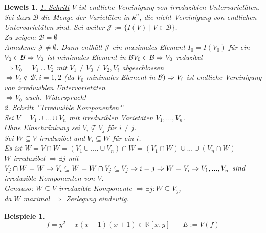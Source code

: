 \documentclass[a4paper,12pt]{report}
\theoremstyle{break}
\newtheorem{Bsp}[Def]{Beispiele}
\theoremstyle{nonumberbreak}
\newtheorem{Bew}{Beweis}
\theoremstyle{nonumberplain}
\begin{document}
\begin{Bew}
\underline{1. Schritt} $V$ ist endliche Vereinigung von irreduziblen Untervarietäten.\\
Sei dazu $\mathcal{B}$ die Menge der Varietäten in $k^n$, die nicht Vereinigung von endlichen Untervarietäten sind. Sei weiter $\mathcal{J}:=\{ I(V)\mid V\in \mathcal{B}\}$.\\
Zu zeigen: $\mathcal{B}=\emptyset$\\
Annahme: $\mathcal{J}\neq \emptyset$. Dann enthält $\mathcal{J}$ ein maximales Element $I_0=I(V_0)$ für ein $V_0\in \mathcal{B}\\
\Rightarrow V_0$ ist minimales Element in $\mathcal{B}\\
V_0 \in \mathcal{B} \Rightarrow V_0$ reduzibel\\
$\Rightarrow V_0 = V_1 \cup V_2$ mit $V_1\neq V_0\neq V_2, V_i$ abgeschlossen\\
$\Rightarrow V_i \notin\mathcal{B}, i=1,2$ (da $V_0$ minimales Element in $\mathcal{B})\\
\Rightarrow V_i$ ist endliche Vereinigung von irreduziblen Untervarietäten\\
$\Rightarrow V_0$ auch. Widerspruch!\\
\underline{2. Schritt} "'Irreduzible Komponenten"'\\
Sei $V=V_1\cup ... \cup V_n$ mit irreduziblen Varietäten $V_1,... , V_n$.
\\Ohne Einschränkung sei $V_i\nsubseteq V_j$ für $i\neq j$.\\
Sei $W\subseteq V$ irreduzibel und $V_i\subseteq W$ für ein $i$.\\
Es ist $W=V\cap W= (V_1 \cup .... \cup V_n)\cap W= (V_1 \cap W)\cup ... \cup (V_n \cap W)$\\
$W$ irreduzibel $\Rightarrow\exists j$ mit $V_j\cap W = W\\
\Rightarrow V_i \subseteq W= W \cap V_j\subseteq V_j\Rightarrow i=j \Rightarrow W=V_i\\
\Rightarrow V_1,..., V_n$ sind irreduzible Komponenten von $V$.\\
Genauso: $W\subseteq V$ irreduzible Komponente $\Rightarrow \exists j : W \subseteq V_j$,\\
da $W$ maximal $\Rightarrow$ Zerlegung eindeutig.
\end{Bew}
\begin{Bsp}
$$f=y^2-x(x-1)(x+1) \in\mathbb{R}[x,y]~~~~~~~~E:=V(f)$$
\end{Bsp}
\end{document}
